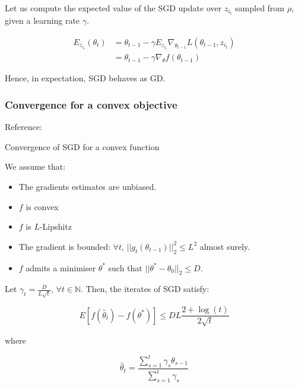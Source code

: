 \documentclass[
10pt, %
a4paper, %
oneside, %
headinclude,footinclude, %
BCOR5mm, %
]{scrartcl}
\begin{document}
Let us compute the expected value of the SGD update over $z_{i_t}$ sampled from $\rho$, given a learning rate $\gamma$.

\begin{equation*}
    \begin{aligned}
	E_{z_{i_t}}(\theta_t) &= \theta_{t-1} - \gamma E_{z_{i_i}} \nabla_{\theta_{t-1}} L(\theta_{t-1}, z_{i_t})\\
	&= \theta_{t-1} - \gamma \nabla_{\theta} f(\theta_{t-1})
    \end{aligned}
\end{equation*}

Hence, in expectation, SGD behaves as GD.


\subsubsection{\large\color{Periwinkle}Convergence for a convex objective}

Reference: \cite[]{Bach2021} 

\begin{theorem}{Convergence of SGD for a convex function}
    \label{th:sgdconvex}

    We assume that:
    \begin{itemize}
	\item The gradients estimates are unbiased.
        \item $f$ is convex
	\item $f$ is $L$-Lipshitz
	\item The gradient is bounded: $\forall t$, $||g_t(\theta_{t-1})||_2^2\leq L^2$ almost surely.
	\item $f$ admits a minimiser $ \theta^*$ such that $||\theta^*-\theta_0||_2\leq D$.
    \end{itemize}

    Let $\gamma_t = \frac{D}{L \sqrt{t} } $, $\forall t\in \mathbb{N} $. Then, the iterates of SGD satisfy:

    \begin{equation*}
	E[f( \hat{\theta}_t)-f(\theta^*)]\leq DL \frac{2+\log(t)}{2 \sqrt{t} }
    \end{equation*}

    where 

    \begin{equation*}
	\hat{\theta}_t = \frac{ \sum^{t}_{s=1} \gamma_s\theta_{s-1}}{ \sum^{t}_{s=1} \gamma_s} 
    \end{equation*}

\end{theorem}
\end{document}
